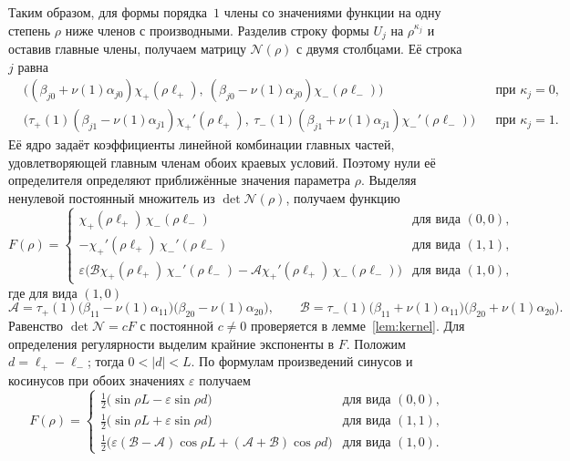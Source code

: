\documentclass[12pt,a4paper]{article}
\numberwithin{equation}{section}
\theoremstyle{definition}
\newcommand{\abs}[1]{\lvert#1\rvert}
\newcommand{\Mm}{\mathcal N}
\begin{document}
Таким образом, для формы порядка~$1$ члены со значениями функции на одну степень $\rho$
ниже членов с производными. Разделив строку формы $U_j$ на $\rho^{\kappa_j}$ и оставив
главные члены, получаем матрицу $\Mm(\rho)$ с двумя столбцами. Её строка $j$ равна
\begin{equation}\label{eq:M}
\begin{aligned}
&\bigl((\beta_{j0}+\nu(1)\alpha_{j0})\chi_+(\rho\ell_+),\
 (\beta_{j0}-\nu(1)\alpha_{j0})\chi_-(\rho\ell_-)\bigr) &&\text{при } \kappa_j=0,\\
&\bigl(\tau_+(1)(\beta_{j1}-\nu(1)\alpha_{j1})\chi_+'(\rho\ell_+),\
 \tau_-(1)(\beta_{j1}+\nu(1)\alpha_{j1})\chi_-'(\rho\ell_-)\bigr) &&\text{при } \kappa_j=1.
\end{aligned}
\end{equation}
Её ядро задаёт коэффициенты линейной комбинации главных частей, удовлетворяющей
главным членам обоих краевых условий. Поэтому нули её определителя определяют
приближённые значения параметра $\rho$. Выделяя ненулевой постоянный множитель из
$\det\Mm(\rho)$, получаем функцию
\begin{equation}\label{eq:F}
 F(\rho)=\begin{cases}
 \chi_+(\rho\ell_+)\,\chi_-(\rho\ell_-) & \text{для вида } (0,0),\\
 -\chi_+'(\rho\ell_+)\,\chi_-'(\rho\ell_-) & \text{для вида } (1,1),\\
 \varepsilon\bigl(\mathcal B\chi_+(\rho\ell_+)\,\chi_-'(\rho\ell_-)
 -\mathcal A\chi_+'(\rho\ell_+)\,\chi_-(\rho\ell_-)\bigr) & \text{для вида } (1,0),
 \end{cases}
\end{equation}
где для вида $(1,0)$
\[
 \mathcal A=\tau_+(1)\bigl(\beta_{11}-\nu(1)\alpha_{11}\bigr)\bigl(\beta_{20}-\nu(1)\alpha_{20}\bigr),
 \qquad
 \mathcal B=\tau_-(1)\bigl(\beta_{11}+\nu(1)\alpha_{11}\bigr)\bigl(\beta_{20}+\nu(1)\alpha_{20}\bigr).
\]
Равенство $\det\Mm=cF$ с постоянной $c\ne0$ проверяется в
лемме~\ref{lem:kernel}. Для определения регулярности выделим крайние экспоненты
в $F$. Положим $d=\ell_+-\ell_-$; тогда $0<\abs d<L$. По формулам произведений
синусов и косинусов при обоих значениях $\varepsilon$ получаем
\begin{equation}\label{eq:Ftrig}
 F(\rho)=\begin{cases}
 \frac12\bigl(\sin\rho L-\varepsilon\sin\rho d\bigr) & \text{для вида } (0,0),\\
 \frac12\bigl(\sin\rho L+\varepsilon\sin\rho d\bigr) & \text{для вида } (1,1),\\
 \frac12\bigl(\varepsilon(\mathcal B-\mathcal A)\cos\rho L+(\mathcal A+\mathcal B)\cos\rho d\bigr)
 & \text{для вида } (1,0).
 \end{cases}
\end{equation}
\end{document}
